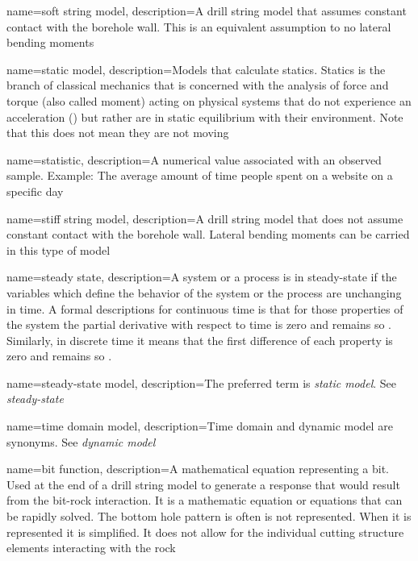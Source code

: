 {
	name=soft string model,
	description={A drill string model that assumes constant contact with the borehole wall.  This is an equivalent assumption to no lateral bending moments}
}

{
	name=static model,
	description=Models that calculate statics.  Statics is the branch of classical mechanics that is concerned with the analysis of force and torque (also called moment) acting on physical systems that do not experience an acceleration (\staticforcebalance)\comma{} but rather\comma{} are in static equilibrium with their environment.  Note that this does not mean they are not moving
}

{
	name=statistic,
	description={A numerical value associated with an observed sample.  Example: The average amount of time people spent on a website on a specific day}
}

{
	name=stiff string model,
	description={A drill string model that does not assume constant contact with the borehole wall.  Lateral bending moments can be carried in this type of model}
}

{
	name=steady state,
	description=A system or a process is in steady-state if the variables which define the behavior of the system or the process are unchanging in time.  A formal descriptions for continuous time\comma{} is that for those properties \systemproperty{} of the system\comma{} the partial derivative with respect to time is zero and remains so \continuoussteadystate{}.  Similarly, in discrete time\comma{} it means that the first difference of each property is zero and remains so \discretesteadystate{}.
}

{
	name=steady-state model,
	description=The preferred term is \textit{static model}.  See \emph{steady-state}
}


{
	name=time domain model,
	description=Time domain and dynamic model are synonyms.  See \emph{dynamic model}
}

{
	name=bit function,
	description=A mathematical equation representing a bit.  Used at the end of a drill string model to generate a response that would result from the bit-rock interaction.  It is a mathematic equation or equations that can be rapidly solved.  The bottom hole pattern is often is not represented.  When it is represented it is simplified.  It does not allow for the individual cutting structure elements interacting with the rock
}

